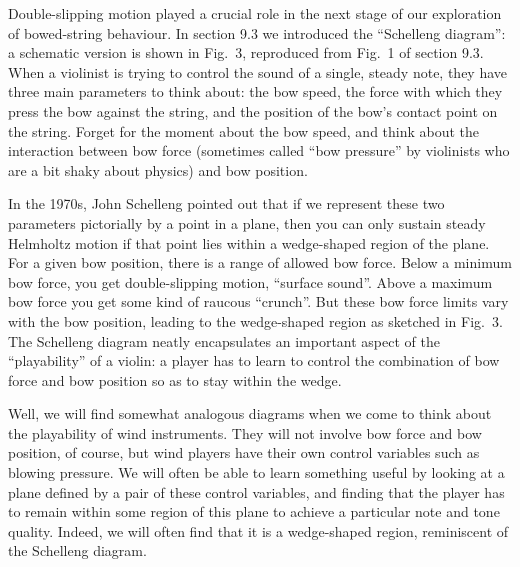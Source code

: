   Double-slipping motion played a crucial role in the next stage of our 
  exploration of bowed-string behaviour. In section 9.3 we introduced the 
  “Schelleng diagram”: a schematic version is shown in Fig.\ 3, reproduced from 
  Fig.\ 1 of section 9.3. When a violinist is trying to control the sound of a 
  single, steady note, they have three main parameters to think about: the bow 
  speed, the force with which they press the bow against the string, and the 
  position of the bow’s contact point on the string. Forget for the moment 
  about the bow speed, and think about the interaction between bow force 
  (sometimes called “bow pressure” by violinists who are a bit shaky about 
  physics) and bow position. 


  In the 1970s, John Schelleng pointed out that if we represent these two 
  parameters pictorially by a point in a plane, then you can only sustain 
  steady Helmholtz motion if that point lies within a wedge-shaped region of 
  the plane. For a given bow position, there is a range of allowed bow force. 
  Below a minimum bow force, you get double-slipping motion, “surface sound”. 
  Above a maximum bow force you get some kind of raucous “crunch”. But these 
  bow force limits vary with the bow position, leading to the wedge-shaped 
  region as sketched in Fig.\ 3. The Schelleng diagram neatly encapsulates an 
  important aspect of the “playability” of a violin: a player has to learn to 
  control the combination of bow force and bow position so as to stay within 
  the wedge. 

  Well, we will find somewhat analogous diagrams when we come to think about 
  the playability of wind instruments. They will not involve bow force and bow 
  position, of course, but wind players have their own control variables such 
  as blowing pressure. We will often be able to learn something useful by 
  looking at a plane defined by a pair of these control variables, and finding 
  that the player has to remain within some region of this plane to achieve a 
  particular note and tone quality. Indeed, we will often find that it is a 
  wedge-shaped region, reminiscent of the Schelleng diagram. 
